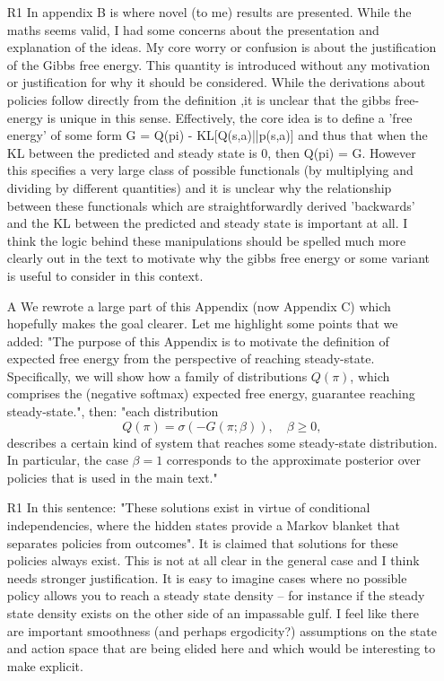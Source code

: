 \documentclass{article}
\begin{document}
\begin{itemize}
\item[R1] In appendix B is where novel (to me) results are presented. While the maths seems valid, I had some concerns about the presentation and explanation of the ideas. My core worry or confusion is about the justification of the Gibbs free energy. This quantity is introduced without any motivation or justification for why it should be considered. While the derivations about policies follow directly from the definition ,it is unclear that the gibbs free-energy is unique in this sense. Effectively, the core idea is to define a 'free energy' of some form G = Q(pi) - KL[Q(s,a)||p(s,a)] and thus that when the KL between the predicted and steady state is 0, then Q(pi) = G. However this specifies a very large class of possible functionals (by multiplying and dividing by different quantities) and it is unclear why the relationship between these functionals which are straightforwardly derived 'backwards' and the KL between the predicted and steady state is important at all. I think the
logic behind these manipulations should be spelled much more clearly out in the text to motivate why the gibbs free energy or some variant is useful to consider in this context.
\item[A] We rewrote a large part of this Appendix (now Appendix C) which hopefully makes the goal clearer. Let me highlight some points that we added: "The purpose of this Appendix is to motivate the definition of expected free energy from the perspective of reaching steady-state. Specifically, we will show how a family of distributions $Q(\pi)$, which comprises the (negative softmax) expected free energy, guarantee reaching steady-state.", then: "each distribution
\begin{equation}
   Q(\pi) =\sigma(-G(\pi; \beta)),\quad \beta \geq 0,
\end{equation}
describes a certain kind of system that reaches some steady-state distribution. In particular, the case $\beta =1$ corresponds to the approximate posterior over policies that is used in the main text."
\item[R1] In this sentence: "These solutions exist in virtue of conditional independencies, where the hidden states provide a Markov blanket that separates policies from outcomes". It is claimed that solutions for these policies always exist. This is not at all clear in the general case and I think needs stronger justification. It is easy to imagine cases where no possible policy allows you to reach a steady state density -- for instance if the steady state density exists on the other side of an impassable gulf. I feel like there are important smoothness (and perhaps ergodicity?) assumptions on the state and action space that are being elided here and which would be interesting to make explicit.

\end{itemize}
\end{document}
